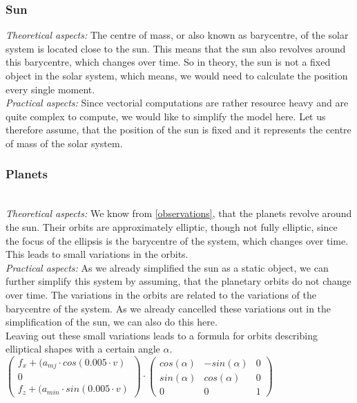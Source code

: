\documentclass[conference,compsoc]{IEEEtran}
\begin{document}
\subsubsection{Sun}
\hfill\newline
\label{Sun}
\emph{Theoretical aspects: }The centre of mass, or also known as barycentre, of the solar system is located close to the sun. This means that the sun also revolves around this barycentre, which changes over time. So in theory, the sun is not a fixed object in the solar system, which means, we would need to calculate the position every single moment.\\
\emph{Practical aspects: } Since vectorial computations are rather resource heavy and are quite complex to compute, we would like to simplify the model here. Let us therefore assume, that the position of the sun is fixed and it represents the centre of mass of the solar system. 
\subsubsection{Planets}\hfill\\
\label{Planets}
\emph{Theoretical aspects: } We know from \ref{observations}, that the planets revolve around the sun. Their orbits are approximately elliptic, though not fully elliptic, since the focus of the ellipsis is the barycentre of the system, which changes over time. This leads to small variations in the orbits. \\
\emph{Practical aspects: } As we already simplified the sun as a static object, we can further simplify this system by assuming, that the planetary orbits do not change over time. The variations in the orbits are related to the variations of the barycentre of the system. As we already cancelled these variations out in the simplification of the sun, we can also do this here. \\
Leaving out these small variations leads to a formula for orbits describing elliptical shapes with a certain angle $\alpha$.
$\begin{pmatrix}
	f_{x} + (a_{mj} \cdot cos(0.005 \cdot v) \\ 0\\
	f_{z} + (a_{min} \cdot sin(0.005 \cdot v)
\end{pmatrix} \cdot \begin{pmatrix}
	cos(\alpha) & -sin(\alpha) & 0 \\
	sin(\alpha) & cos(\alpha) & 0 \\
	0 & 0 & 1
\end{pmatrix} $
\end{document}
